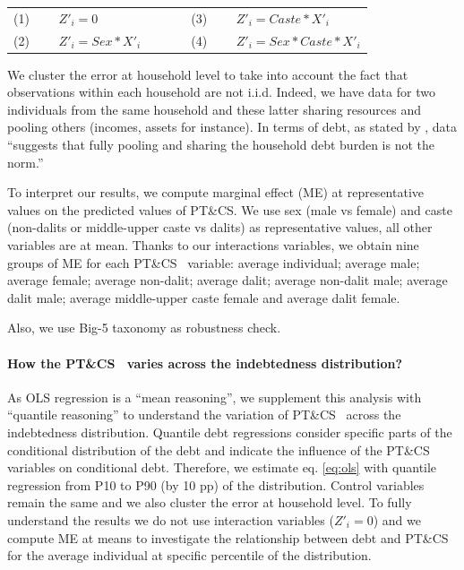 \documentclass[a4paper, 12pt, onecolumn]{article}
\newcommand{\PTCS}{PT\&CS}
\begin{document}
\begin{table}[h!]
\centering
\begin{tabular}{lllll}
(1)~~~~ $Z'_{i}=0$ & & & & (3)~~~~ $Z'_{i}=Caste*X'_{i}$ \\
(2)~~~~ $Z'_{i}=Sex*X'_{i}$ & & & & (4)~~~~ $Z'_{i}=Sex*Caste*X'_{i}$ \\
\end{tabular}%
\end{table}%

We cluster the error at household level to take into account the fact that observations within each household are not i.i.d.
Indeed, we have data for two individuals from the same household and these latter sharing resources and pooling others (incomes, assets for instance).%
In terms of debt, as stated by \cite{Reboul2021}, data ``suggests that fully pooling and sharing the household debt burden is not the norm.''

To interpret our results, we compute marginal effect (ME) at representative values on the predicted values of \PTCS.%
We use sex (male vs female) and caste (non-dalits or middle-upper caste vs dalits) as representative values, all other variables are at mean.
Thanks to our interactions variables, we obtain nine groups of ME for each \PTCS~ variable: average individual; average male; average female; average non-dalit; average dalit; average non-dalit male; average dalit male; average middle-upper caste female and average dalit female. 

Also, we use Big-5 taxonomy as robustness check.

\paragraph{How the \PTCS~ varies across the indebtedness distribution?}
As OLS regression is a ``mean reasoning'', we supplement this analysis with ``quantile reasoning'' to understand the variation of \PTCS~ across the indebtedness distribution.
Quantile debt regressions consider specific parts of the conditional distribution of the debt and indicate the influence of the \PTCS~ variables on conditional debt.
Therefore, we estimate eq. \ref{eq:ols} with quantile regression from P10 to P90 (by 10 pp) of the distribution.
Control variables remain the same and we also cluster the error at household level.
To fully understand the results we do not use interaction variables ($Z'_{i}=0$) and we compute ME at means to investigate the relationship between debt and \PTCS~ for the average individual at specific percentile of the distribution.
\end{document}
